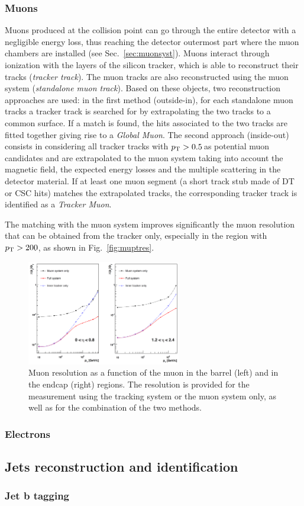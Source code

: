 \subsubsection{Muons}
Muons produced at the collision point can go through the entire detector with a negligible energy loss, thus reaching the detector outermost part where the muon chambers are installed (see Sec.~\ref{sec:muonsyst}). Muons interact through ionization with the layers of the silicon tracker, which is able to reconstruct their tracks (\emph{tracker track}). The muon tracks are also reconstructed using the muon system (\emph{standalone muon track}). Based on these objects, two reconstruction approaches are used: in the first method (outside-in), for each standalone muon tracks a tracker track is searched for by extrapolating the two tracks to a common surface. If a match is found, the hits associated to the two tracks are fitted together giving rise to a \emph{Global Muon}. The second approach (inside-out) consists in considering all tracker tracks with $p_\mathrm{T} > 0.5$\,\GeV as potential muon candidates and are extrapolated to the muon system taking into account the magnetic field, the expected energy losses and the multiple scattering in the detector material. If at least one muon segment (a short track stub made of DT or CSC hits) matches the extrapolated tracks, the corresponding tracker track is identified as a \emph{Tracker Muon}.

The matching with the muon system improves significantly the muon \pt resolution that can be obtained from the tracker only, especially in the region with $p_\mathrm{T} > 200$\GeV, as shown in Fig.~\ref{fig:muptres}.
\begin{figure}[htb]
\centering
\includegraphics[width=0.6\textwidth]{images/muptres.png}
\caption{Muon \pt resolution as a function of the muon \pt in the barrel (left) and in the endcap (right) regions. The resolution is provided for the measurement using the tracking system or the muon system only, as well as for the combination of the two methods.}\label{fig:muptrese}
\end{figure}
\subsubsection{Electrons}
	

	
\subsection{Jets reconstruction and identification}\label{chap2:jets}

	\subsubsection{Jet b tagging}
